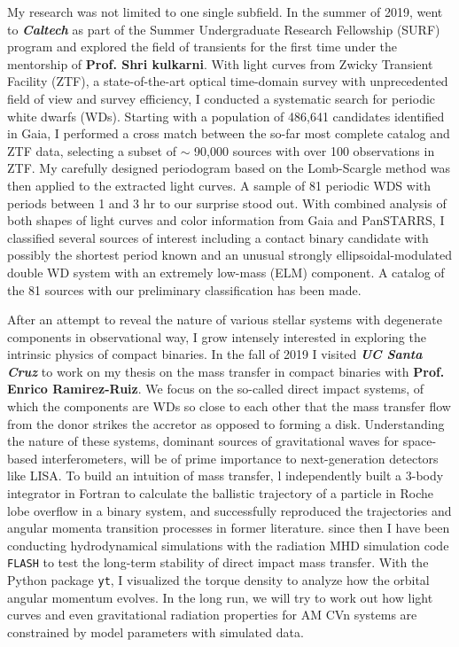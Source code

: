 \documentclass[11pt, a4paper]{awesome-cv} %
\begin{document}
	My research was not limited to one single subfield. In the summer of 2019, went to \textbf{\textit{Caltech}} as part of the Summer Undergraduate Research Fellowship (SURF) program and explored the field of transients for the first time under the mentorship of \textbf{Prof. Shri kulkarni}. With light curves from Zwicky Transient Facility (ZTF), a state-of-the-art optical time-domain survey with unprecedented field of view and survey efficiency, I conducted a systematic search for periodic white dwarfs (WDs). Starting with a population of 486,641 candidates identified in Gaia, I performed a cross match between the so-far most complete catalog and ZTF data, selecting a subset of \(\sim\)  90,000 sources with over 100 observations in ZTF. My carefully designed periodogram based on the Lomb-Scargle method was then applied to the extracted light curves. A sample of 81 periodic WDS with periods between 1 and 3 hr to our surprise stood out. With combined analysis of both shapes of light curves and color information from Gaia and PanSTARRS, I classified several sources of interest including a contact binary candidate with possibly the shortest period known and an unusual strongly ellipsoidal-modulated double WD system with an extremely low-mass (ELM) component. A catalog of the 81 sources with our preliminary classification has been made.
	
	After an attempt to reveal the nature of various stellar systems with degenerate components in observational way, I grow intensely interested in exploring the intrinsic physics of compact binaries. In the fall of 2019 I visited \textbf{\textit{UC Santa Cruz}} to work on my thesis on the mass transfer in compact binaries with \textbf{Prof. Enrico Ramirez-Ruiz}. We focus on the so-called direct impact systems, of which the components are WDs so close to each other that the mass transfer flow from the donor strikes the accretor as opposed to forming a disk. Understanding the nature of these systems, dominant sources of gravitational waves for space-based interferometers, will be of prime importance to next-generation detectors like LISA. To build an intuition of mass transfer, l independently built a 3-body integrator in Fortran to calculate the ballistic trajectory of a particle in Roche lobe overflow in a binary system, and successfully reproduced the trajectories and angular momenta transition processes in former literature. since then I have been conducting hydrodynamical simulations with the radiation MHD simulation code \texttt{FLASH} to test the long-term stability of direct impact mass transfer. With the Python package \texttt{yt}, I visualized the torque density to analyze how the orbital angular momentum evolves. In the long run, we will try to work out how light curves and even gravitational radiation properties for AM CVn systems are constrained by model parameters with simulated data.
	
\end{document}
